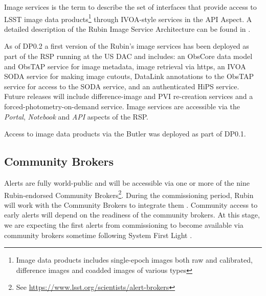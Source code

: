 Image services is the term to describe the set of interfaces that provide access to LSST image data products\footnote{Image data products includes single-epoch images both raw and calibrated, difference images and coadded images of various types} through IVOA-style services in the API Aspect. 
A detailed description of the Rubin Image Service Architecture can be found in .

As of DP0.2 a first version of the Rubin's image services has been deployed as part of the RSP running at the US DAC and includes: an ObsCore data model and ObsTAP service for image metadata, image retrieval via https, an IVOA SODA service for making image cutouts, DataLink annotations to the ObsTAP service for access to the SODA service, and an authenticated HiPS service.
Future releases will include difference-image and PVI re-creation services and a forced-photometry-on-demand service.
Image services are accessible via the \emph{Portal}, \emph{Notebook}  and  \emph{API} aspects of the RSP. 

Access to image data products via the Butler was deployed as part of DP0.1.

\subsection{Community Brokers }

Alerts are fully world-public and will be accessible via one or more of the nine Rubin-endorsed Community Brokers\footnote{See \url{https://www.lsst.org/scientists/alert-brokers}}.
During the commissioning period, Rubin will work with the Community Brokers to integrate them .
Community access to early alerts will depend on the readiness of the community brokers. 
At this stage, we are expecting the first alerts from commissioning to become available via community brokers sometime following System First Light . 
